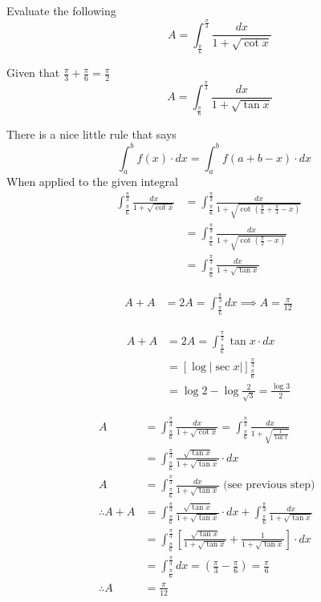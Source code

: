 \documentclass[14pt,fleqn]{extarticle}
\begin{document}
\newcommand\intg{\int_{\frac{\pi}{6}}^{\frac{\pi}{3}}}
\newcommand\ea{ 1 + \sqrt{\cot x}}
\newcommand\eb{ \frac{\sqrt{\tan x}}{1+\sqrt{\tan x}} }
\begin{problem}
	\statement 
    
     Evaluate the following
     \[ \qquad A = \intg \frac{dx}{\ea} \]
     
     \begin{step}
  \begin{options} 
     \correct 
      
      Given that $\frac\pi{3} + \frac\pi{6} = \frac\pi{2}$ 
      \[ \qquad A = \intg \frac{dx}{1+\sqrt{\tan x}} \]
        
    \end{options} 
     \reason 
     
     There is a nice little rule that says 
     \[ \quad \int_a^b f(x)\cdot dx = \int_a^b f \left(a+b-x \right)\cdot dx \]
     When applied to the given integral 
     \begin{align}
	   \intg \frac{dx}{\ea} &= \intg \frac{dx}{1+\sqrt{\cot \left(\frac\pi{6}+\frac\pi{3} -x \right)}} \\
	   &= \intg \frac{dx}{1 + \sqrt{\cot \left(\frac\pi{2} - x \right)}} \\
	   &= \intg \frac{dx}{1+\sqrt{\tan x}}
\end{align}
       
\end{step}

\begin{step}
  \begin{options} 
     \correct 
      
      \begin{align}
	      A + A &= 2A = \intg dx \implies A = \frac{\pi}{12}
\end{align}
     \incorrect
      
      \begin{align}
	A + A &= 2A = \intg \tan x \cdot dx \\
	&= \left[\log \vert \sec x \vert \right]_{\frac\pi{6}}^{\frac\pi{3}} \\
	&= \log 2 - \log \frac{2}{\sqrt{3}} = \frac{\log 3}{2} 
\end{align}  
    \end{options} 
     \reason 
     
     \begin{align}
	    A &= \intg \frac{dx}{\ea} = \intg \frac{dx}{1 + \sqrt{\frac{1}{\tan x}}} \\
	     &= \intg \eb\cdot dx \\
	     A &= \intg \frac{dx}{1 + \sqrt{\tan x}}\text{ (see previous step) } \\
	     \therefore A + A &= \intg \eb\cdot dx + \intg \frac{dx}{1+\sqrt{\tan x}} \\
	     &= \intg \left[\eb + \frac{1}{1+\sqrt{\tan x}} \right]\cdot dx \\
	     &= \intg dx = \left(\frac\pi{3} - \frac\pi{6} \right) = \frac\pi{6} \\
	     \therefore A &= \frac\pi{12} 
\end{align}  
       
\end{step}
\end{problem} 
\end{document}
